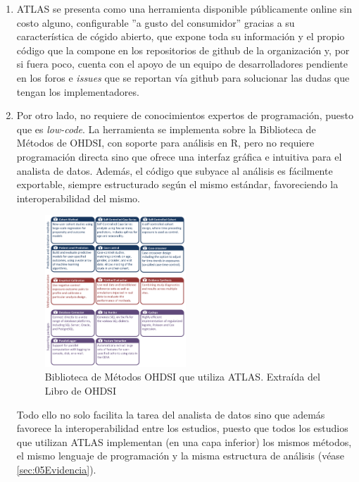 \begin{enumerate}[label=\roman*.]

    \item ATLAS se presenta como una herramienta disponible públicamente online sin costo alguno, configurable ''a gusto del consumidor'' gracias a su característica de cógido abierto, que expone toda su información y el propio código que la compone en los repositorios de github de la organización y, por si fuera poco, cuenta con el apoyo de un equipo de desarrolladores pendiente en los foros e \textit{issues} que se reportan vía github para solucionar las dudas que tengan los implementadores. 

    \item Por otro lado, no requiere de conocimientos expertos de programación, puesto que es \textit{low-code}. La herramienta se implementa sobre la Biblioteca de Métodos de OHDSI, con soporte para análisis en R, pero no requiere programación directa sino que ofrece una interfaz gráfica e intuitiva para el analista de datos. Además, el código que subyace al análisis es fácilmente exportable, siempre estructurado según el mismo estándar, favoreciendo la interoperabilidad del mismo.

\begin{figure}[H]
\centering
\includegraphics[width=0.50\textwidth]{figures/methodsLibrary.png}
\caption{Biblioteca de Métodos OHDSI que utiliza ATLAS. Extraída del Libro de OHDSI \cite{OHDSIbook}}
\label{fig:methodsLibrary}
\end{figure}
    
     Todo ello no solo facilita la tarea del analista de datos sino que además favorece la interoperabilidad entre los estudios, puesto que todos los estudios que utilizan ATLAS implementan (en una capa inferior) los mismos métodos, el mismo lenguaje de programación y la misma estructura de análisis (véase \ref{sec:05Evidencia}). 


\end{enumerate}
